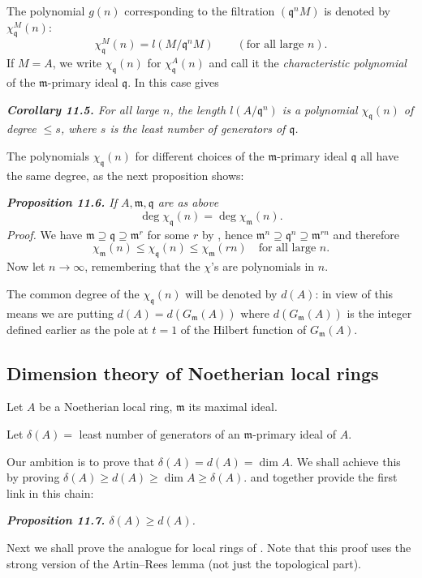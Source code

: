 The polynomial $g(n)$ corresponding to the filtration $(\mathfrak q^nM)$ is denoted by
$\chi_\mathfrak q^M(n)$:
\[
\chi_\mathfrak q^M(n)=l(M/\mathfrak q^nM)\qquad(\text{for all large }n).
\]
If $M=A$, we write $\chi_\mathfrak q(n)$ for $\chi_\mathfrak q^A(n)$ and call it the \emph{characteristic polynomial}
of the $\mathfrak m$-primary ideal $\mathfrak q$.  In this case  gives

\medskip
\noindent\textit{\textbf{Corollary 11.5.} For all large $n$, the length $l(A/\mathfrak q^n)$ is a polynomial $\chi_\mathfrak q(n)$
of degree $\leq s$, where $s$ is the least number of generators of $\mathfrak q$.}\proofbox

The polynomials $\chi_\mathfrak q(n)$ for different choices of the $\mathfrak m$-primary ideal $\mathfrak q$ all have
the same degree, as the next proposition shows:

\medskip
\noindent\textit{\textbf{Proposition 11.6.} If $A,\mathfrak m,\mathfrak q$ are as above}
\[
\deg\chi_\mathfrak q(n)=\deg\chi_\mathfrak m(n).
\]
\noindent\emph{Proof.}  We have $\mathfrak m\supseteq\mathfrak q\supseteq\mathfrak m^r$ for some $r$ by , hence $\mathfrak m^n\supseteq\mathfrak q^n\supseteq\mathfrak m^{rn}$ and
therefore
\[
\chi_\mathfrak m(n)\leq\chi_\mathfrak q(n)\leq\chi_\mathfrak m(rn)\quad\text{for all large }n.
\]
Now let $n\longrightarrow\infty$, remembering that the $\chi$'s are polynomials in $n$.\proofbox

The common degree of the $\chi_\mathfrak q(n)$ will be denoted by $d(A)$: in view of 
this means we are putting $d(A)=d(G_\mathfrak m(A))$ where $d(G_\mathfrak m(A))$ is the integer
defined earlier as the pole at $t=1$ of the Hilbert function of $G_\mathfrak m(A)$.

\subsection{Dimension theory of Noetherian local rings}

Let $A$ be a Noetherian local ring, $\mathfrak m$ its maximal ideal.

Let $\delta(A)={}$ least number of generators of an $\mathfrak m$-primary ideal of $A$.

Our ambition is to prove that $\delta(A)=d(A)=\dim A$.  We shall achieve this by
proving $\delta(A)\geq d(A)\geq\dim A\geq\delta(A)$.   and  together provide the
first link in this chain:

\medskip
\noindent\textit{\textbf{Proposition 11.7.} $\delta(A)\geq d(A)$.}\proofbox

Next we shall prove the analogue for local rings of .  Note that this
proof uses the strong version of the Artin--Rees lemma (not just the topological
part).
